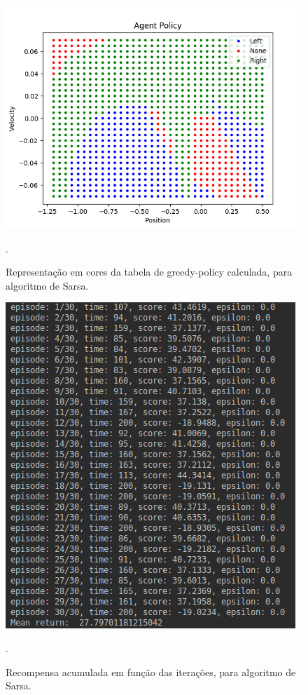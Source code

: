 \documentclass[conference]{IEEEtran}
\begin{document}
\begin{figure}[htbp]
\centering
\centerline{\includegraphics[scale=0.5]{imagens/agent_decision.png}}
\caption{Representação em cores da tabela de greedy-policy calculada, para algoritmo de Sarsa.}.
\label{agent_decision}
\end{figure} 

\begin{figure}[htbp]
\centering
\centerline{\includegraphics[scale=0.4]{imagens/evaluate_dqn_result.png}}
\caption{Recompensa acumulada em função das iterações, para algoritmo de Sarsa.}.
\label{evaluate_dqn_result}
\end{figure}
\end{document}
